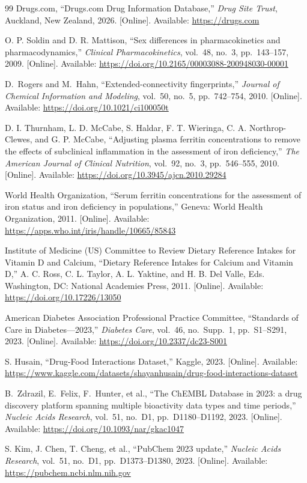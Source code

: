 \begin{thebibliography}{99}
Drugs.com,
``Drugs.com Drug Information Database,''
\textit{Drug Site Trust}, Auckland, New Zealand, 2026.
[Online]. Available: \url{https://drugs.com}

O. P. Soldin and D. R. Mattison,
``Sex differences in pharmacokinetics and pharmacodynamics,''
\textit{Clinical Pharmacokinetics}, vol.~48, no.~3, pp.~143--157, 2009.
[Online]. Available: \url{https://doi.org/10.2165/00003088-200948030-00001}

D.~Rogers and M.~Hahn,
``Extended-connectivity fingerprints,''
\textit{Journal of Chemical Information and Modeling}, vol.~50, no.~5, pp.~742--754, 2010.
[Online]. Available: \url{https://doi.org/10.1021/ci100050t}

D. I. Thurnham, L. D. McCabe, S. Haldar, F. T. Wieringa, C. A. Northrop-Clewes, and G. P. McCabe,
``Adjusting plasma ferritin concentrations to remove the effects of subclinical inflammation in the assessment of iron deficiency,''
\textit{The American Journal of Clinical Nutrition}, vol.~92, no.~3, pp.~546--555, 2010.
[Online]. Available: \url{https://doi.org/10.3945/ajcn.2010.29284}

World Health Organization,
``Serum ferritin concentrations for the assessment of iron status and iron deficiency in populations,''
Geneva: World Health Organization, 2011.
[Online]. Available: \url{https://apps.who.int/iris/handle/10665/85843}

Institute of Medicine (US) Committee to Review Dietary Reference Intakes for Vitamin D and Calcium,
``Dietary Reference Intakes for Calcium and Vitamin D,''
A. C. Ross, C. L. Taylor, A. L. Yaktine, and H. B. Del Valle, Eds.
Washington, DC: National Academies Press, 2011.
[Online]. Available: \url{https://doi.org/10.17226/13050}

American Diabetes Association Professional Practice Committee,
``Standards of Care in Diabetes---2023,''
\textit{Diabetes Care}, vol.~46, no.~Supp.~1, pp.~S1--S291, 2023.
[Online]. Available: \url{https://doi.org/10.2337/dc23-S001}

S. Husain,
``Drug-Food Interactions Dataset,''
Kaggle, 2023.
[Online]. Available: \url{https://www.kaggle.com/datasets/shayanhusain/drug-food-interactions-dataset}

B.~Zdrazil, E.~Felix, F.~Hunter, et al.,
``The ChEMBL Database in 2023: a drug discovery platform spanning multiple bioactivity data types and time periods,''
\textit{Nucleic Acids Research}, vol.~51, no.~D1, pp.~D1180--D1192, 2023.
[Online]. Available: \url{https://doi.org/10.1093/nar/gkac1047}

S. Kim, J. Chen, T. Cheng, et al.,
``PubChem 2023 update,''
\textit{Nucleic Acids Research}, vol.~51, no.~D1, pp.~D1373--D1380, 2023.
[Online]. Available: \url{https://pubchem.ncbi.nlm.nih.gov}

\end{thebibliography}
